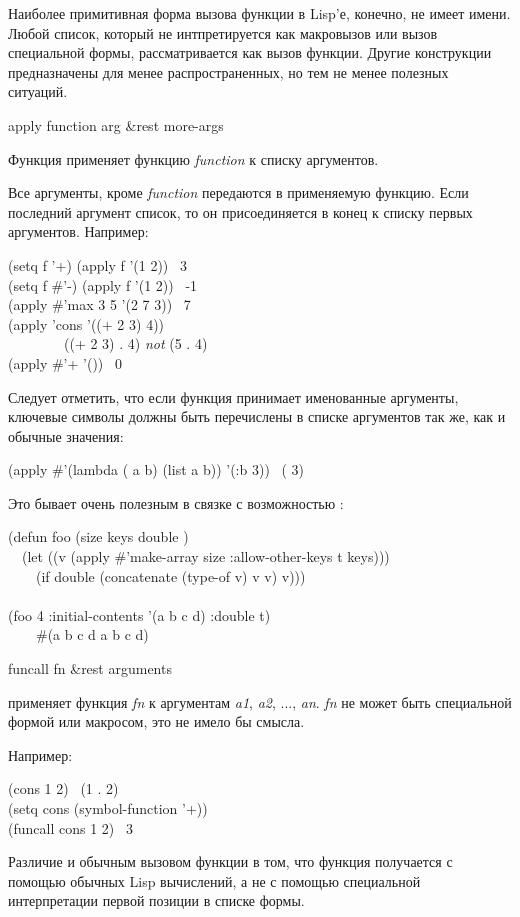 Наиболее примитивная форма вызова функции в Lisp'е, конечно, не имеет
имени. Любой список, который не интпретируется как макровызов или вызов
специальной формы, рассматривается как вызов функции.
Другие конструкции предназначены для менее распространенных, но тем не менее
полезных ситуаций.

\begin{defun}[Function]
apply function arg &rest more-args

Функция применяет функцию \emph{function} к списку аргументов.

Все аргументы, кроме \emph{function} передаются в применяемую функцию.
Если последний аргумент список, то он присоединяется в конец к списку первых
аргументов. Например:
\begin{lisp}
(setq f '+) (apply f '(1 2)) \EV\ 3 \\
(setq f \#'-) (apply f '(1 2)) \EV\ -1 \\
(apply \#'max 3 5 '(2 7 3)) \EV\ 7 \\
(apply 'cons '((+ 2 3) 4)) {\EV} \\
~~~~~~~~((+ 2 3) . 4)	\emph{not} (5 . 4) \\
(apply \#'+ '()) \EV\ 0
\end{lisp}
Следует отметить, что если функция принимает именованные аргументы, ключевые
символы должны быть перечислены в списке аргументов так же, как и обычные
значения:
\begin{lisp}
(apply \#'(lambda ( a b) (list a b)) '(:b 3)) \EV\ ({\nil} 3)
\end{lisp}
Это бывает очень полезным в связке с возможностью :
\begin{lisp}
(defun foo (size  keys  double ) \\
~~(let ((v (apply \#'make-array size :allow-other-keys t keys))) \\
~~~~(if double (concatenate (type-of v) v v) v))) \\
 \\
(foo 4 :initial-contents '(a b c d) :double t) \\
~~~\EV\ \#(a b c d a b c d)
\end{lisp}
\end{defun}

\begin{defun}[Function]
funcall fn &rest arguments

применяет функция \emph{fn} к аргументам 
\emph{a1}, \emph{a2}, ..., \emph{an}.
\emph{fn} не может быть специальной формой или макросом, это не имело бы
смысла. 

Например:
\begin{lisp}
(cons 1 2) \EV\ (1 . 2) \\
(setq cons (symbol-function '+)) \\
(funcall cons 1 2) \EV\ 3
\end{lisp}
Различие  и обычным вызовом функции в том, что функция
получается с помощью обычных Lisp вычислений, а не с помощью специальной
интерпретации первой позиции в списке формы.
\end{defun}

